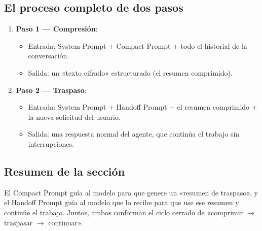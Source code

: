 \subsection{El proceso completo de dos pasos}

\begin{enumerate}
    \item \textbf{Paso 1 — Compresión}:
    \begin{itemize}
        \item Entrada: System Prompt + Compact Prompt + todo el historial de la conversación.
        \item Salida: un «texto cifrado» estructurado (el resumen comprimido).
    \end{itemize}
    \item \textbf{Paso 2 — Traspaso}:
    \begin{itemize}
        \item Entrada: System Prompt + Handoff Prompt + el resumen comprimido + la nueva solicitud del usuario.
        \item Salida: una respuesta normal del agente, que continúa el trabajo sin interrupciones.
    \end{itemize}
\end{enumerate}

\subsection{Resumen de la sección}

El Compact Prompt guía al modelo para que genere un «resumen de traspaso», y el Handoff Prompt guía al modelo que lo recibe para que use ese resumen y continúe el trabajo. Juntos, ambos conforman el ciclo cerrado de «comprimir $\rightarrow$ traspasar $\rightarrow$ continuar».

